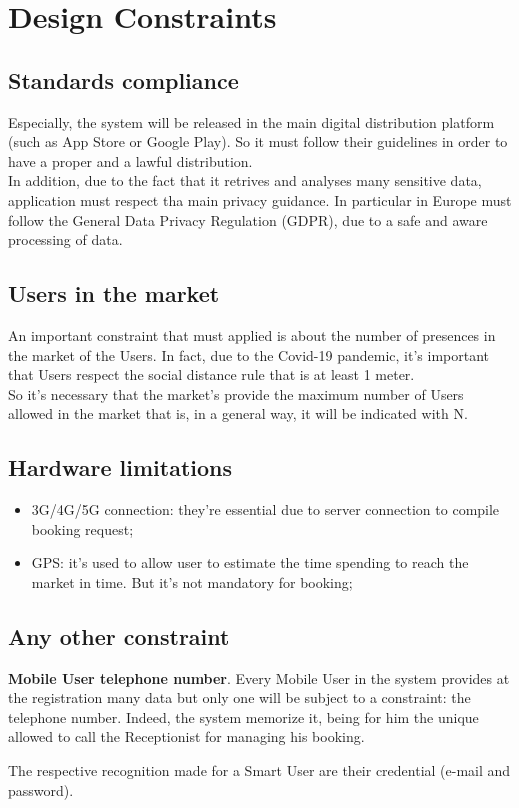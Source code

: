 \section{Design Constraints}
\subsection{Standards compliance}
Especially, the system will be released in the main digital distribution platform (such as App Store or Google Play). So it must follow their guidelines in order to have a proper and a lawful distribution. \\
In addition, due to the fact that it retrives and analyses many sensitive data, application must respect tha main privacy guidance. In particular in Europe must follow the General Data Privacy Regulation (GDPR), due to a safe and aware processing of data. 
\par
\subsection{Users in the market}
An important constraint that must applied is about the number of presences in the market of the Users. In fact, due to the Covid-19 pandemic, it's important that Users respect the social distance rule that is at least 1 meter.\\
So it's necessary that the market's provide the maximum number of Users allowed in the market that is, in a general way, it will be indicated with N.
\par
\subsection{Hardware limitations}
\begin{itemize}
\item 3G/4G/5G connection: they're essential due to server connection to compile booking request;
\item GPS: it's used to allow user to estimate the time spending to reach the market in time. But it's not mandatory for booking;
\end{itemize}
\subsection{Any other constraint}
\textbf{Mobile User telephone number}. Every Mobile User in the system provides at the registration many data but only one will be subject to a constraint: the telephone number. Indeed, the system memorize it, being for him the unique allowed to call the Receptionist for managing his booking. \par
The respective recognition made for a Smart User are their credential (e-mail and password).

